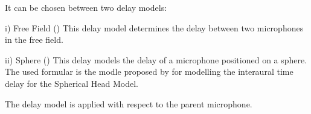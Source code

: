 It can be chosen between two delay models:

i) Free Field ()
This delay model determines the delay between two microphones in the free field.

ii) Sphere ()
This delay models the delay of a microphone positioned on a sphere. The used formular is
the modle proposed by \citet{BrownDuda} for modelling the interaural time delay for the
Spherical Head Model.

The delay model is applied with respect to the parent microphone.








